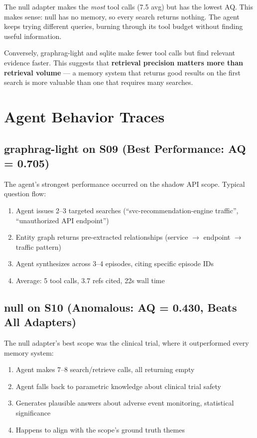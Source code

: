 \documentclass[11pt,a4paper]{article}
\begin{document}
The null adapter makes the \emph{most} tool calls (7.5 avg) but has the lowest AQ.
This makes sense: null has no memory, so every search returns nothing.
The agent keeps trying different queries, burning through its tool budget without finding useful information.

Conversely, graphrag-light and sqlite make fewer tool calls but find relevant evidence faster.
This suggests that \textbf{retrieval precision matters more than retrieval volume} --- a memory system that returns good results on the first search is more valuable than one that requires many searches.

\section{Agent Behavior Traces}

\subsection{graphrag-light on S09 (Best Performance: AQ = 0.705)}

The agent's strongest performance occurred on the shadow API scope.
Typical question flow:
\begin{enumerate}[nosep]
  \item Agent issues 2--3 targeted searches (``svc-recommendation-engine traffic'', ``unauthorized API endpoint'')
  \item Entity graph returns pre-extracted relationships (service $\to$ endpoint $\to$ traffic pattern)
  \item Agent synthesizes across 3--4 episodes, citing specific episode IDs
  \item Average: 5 tool calls, 3.7 refs cited, 22s wall time
\end{enumerate}

\subsection{null on S10 (Anomalous: AQ = 0.430, Beats All Adapters)}

The null adapter's best scope was the clinical trial, where it outperformed every memory system:
\begin{enumerate}[nosep]
  \item Agent makes 7--8 search/retrieve calls, all returning empty
  \item Agent falls back to parametric knowledge about clinical trial safety
  \item Generates plausible answers about adverse event monitoring, statistical significance
  \item Happens to align with the scope's ground truth themes
\end{enumerate}
\end{document}
